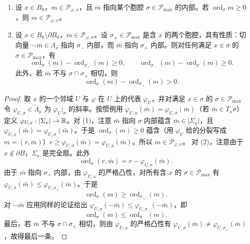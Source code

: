 \begin{lemma}
\begin{enumerate}[label=(\arabic*),leftmargin=2.2em]
\item 设 $x\in B_0$，$m\in\mathcal{P}_{\varphi,x}$，且 $\bar m$ 指向某个胞腔 $\sigma\in\mathcal{P}_{\max}$ 的内部。若 $\operatorname{ord}_\sigma m\ge0$，则 $m\in\mathcal{P}_{\varphi,x}$。
\item 设 $x\in B_0\setminus\partial B_0$，$m\in\mathcal{P}_{\varphi,x}$。设 $\sigma_\pm\in\mathcal{P}_{\max}$ 是含 $x$ 的两个胞腔，具有性质：切向量 $-\bar m\in\Lambda_x$ 指向 $\sigma_-$ 内部，而 $\bar m$ 指向 $\sigma_+$ 内部。则对任何满足 $x\in\sigma$ 的 $\sigma\in\mathcal{P}_{\max}$，有
\[
\operatorname{ord}_\sigma(m)-\operatorname{ord}_{\sigma_+}(m)\ge0,\qquad
\operatorname{ord}_{\sigma_-}(m)-\operatorname{ord}_\sigma(m)\ge0.
\]
此外，若 $\bar m$ 不与 $\sigma\cap\sigma_+$ 相切，则
\[
\operatorname{ord}_\sigma(m)-\operatorname{ord}_{\sigma_+}(m)>0.
\]
\end{enumerate}
\end{lemma}

\begin{proof}
取 $x$ 的一个邻域 $U$ 与 $\varphi$ 在 $U$ 上的代表 $\varphi_U$，并对满足 $x\in\sigma$ 的 $\sigma\in\mathcal{P}_{\max}$ 令 $\varphi_{U,\sigma}\in\check\Lambda_x$ 为 $\varphi_U|_\sigma$ 的斜率。按惯例用 $\varphi_{U,x}(\bar m)=\varphi_{U,\sigma}(\bar m)$（若 $\bar m\in T_x\sigma$）定义 $\varphi_{U,x}:|\Sigma_x|\to\mathbb{R}$。对 (1)，注意 $\bar m$ 指向 $\sigma$ 内部蕴含 $\bar m\in|\Sigma_x|$，且 $\varphi_{U,x}(\bar m)=\varphi_{U,\sigma}(\bar m)$。于是 $\operatorname{ord}_\sigma(m)\ge0$ 蕴含（用 $\varphi_U$ 给的分裂写成 $m=(r,\bar m)$）$r\ge\varphi_{U,\sigma}(\bar m)=\varphi_{U,x}(\bar m)$。所以 $m\in\mathcal{P}_{\varphi,x}$。
对 (2)，注意由于 $x\notin\partial B$，$\Sigma_x$ 是完全扇。此外
\[
\operatorname{ord}_\sigma(r,\bar m)=r-\varphi_{U,\sigma}(\bar m).
\]
由于 $\bar m$ 指向 $\sigma_+$ 内部，由 $\varphi_{U,x}$ 的严格凸性，对所有含 $x$ 的 $\sigma\in\mathcal{P}_{\max}$ 有 $\varphi_{U,\sigma}(\bar m)\le\varphi_{U,\sigma_+}(\bar m)$。于是
\[
\operatorname{ord}_\sigma(m)\ge\operatorname{ord}_{\sigma_+}(m).
\]
对 $-\bar m$ 应用同样的论证给出 $\varphi_{U,\sigma}(-\bar m)\le\varphi_{U,\sigma_-}(-\bar m)$，即
\[
\operatorname{ord}_\sigma(m)\le\operatorname{ord}_{\sigma_-}(m).
\]
最后，若 $\bar m$ 不与 $\sigma\cap\sigma_+$ 相切，则由 $\varphi_{U,x}$ 的严格凸性有 $\varphi_{U,\sigma}(\bar m)\neq\varphi_{U,\sigma_+}(\bar m)$，故得最后一条。
\end{proof}

